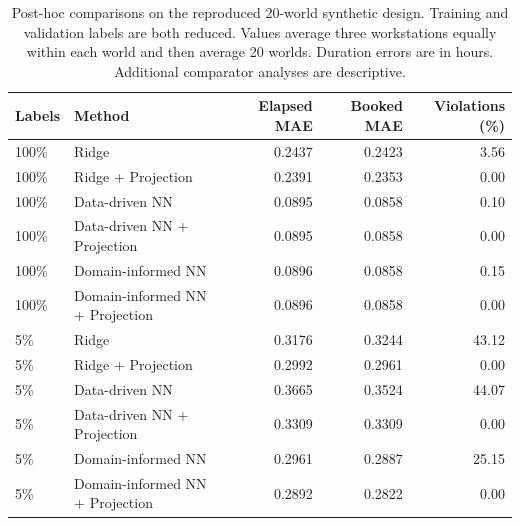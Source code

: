 \begin{table}[t]
\centering\small
\caption{Post-hoc comparisons on the reproduced 20-world synthetic design. Training and validation labels are both reduced. Values average three workstations equally within each world and then average 20 worlds. Duration errors are in hours. Additional comparator analyses are descriptive.}
\label{tab:confirmation_projection}
\begin{tabular}{llrrr}
\toprule
Labels & Method & Elapsed MAE & Booked MAE & Violations (\%) \\
\midrule
100\% & Ridge & 0.2437 & 0.2423 & 3.56 \\
100\% & Ridge + Projection & 0.2391 & 0.2353 & 0.00 \\
100\% & Data-driven NN & 0.0895 & 0.0858 & 0.10 \\
100\% & Data-driven NN + Projection & 0.0895 & 0.0858 & 0.00 \\
100\% & Domain-informed NN & 0.0896 & 0.0858 & 0.15 \\
100\% & Domain-informed NN + Projection & 0.0896 & 0.0858 & 0.00 \\
\midrule
5\% & Ridge & 0.3176 & 0.3244 & 43.12 \\
5\% & Ridge + Projection & 0.2992 & 0.2961 & 0.00 \\
5\% & Data-driven NN & 0.3665 & 0.3524 & 44.07 \\
5\% & Data-driven NN + Projection & 0.3309 & 0.3309 & 0.00 \\
5\% & Domain-informed NN & 0.2961 & 0.2887 & 25.15 \\
5\% & Domain-informed NN + Projection & 0.2892 & 0.2822 & 0.00 \\
\bottomrule
\end{tabular}
\end{table}
